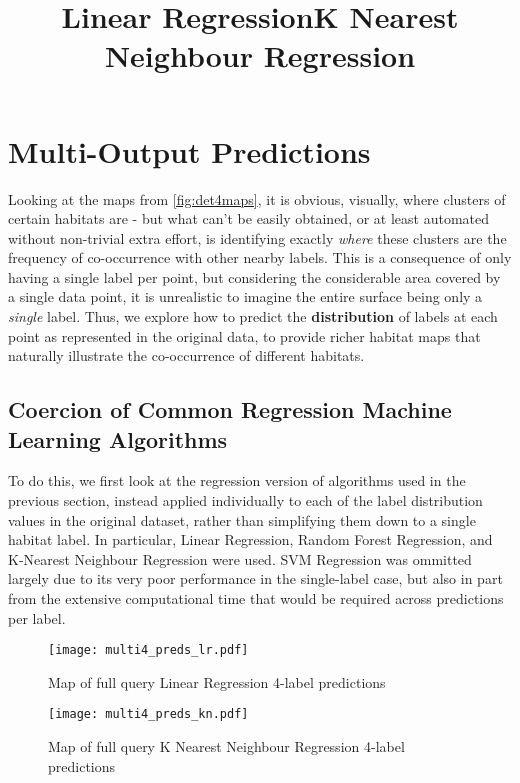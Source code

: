 

\section{Multi-Output Predictions} 
Looking at the maps from \autoref{fig:det4maps}, it is obvious, visually, where clusters of certain habitats are - but what can't be easily obtained, or at least automated without non-trivial extra effort, is identifying exactly \textit{where} these clusters are the frequency of co-occurrence with other nearby labels. This is a consequence of only having a single label per point, but considering the considerable area covered by a single data point, it is unrealistic to imagine the entire surface being only a \textit{single} label. Thus, we explore how to predict the \textbf{distribution} of labels at each point as represented in the original data, to provide richer habitat maps that naturally illustrate the co-occurrence of different habitats.

\subsection{Coercion of Common Regression Machine Learning Algorithms} \label{ss:commonMLcoercion}
To do this, we first look at the regression version of algorithms used in the previous section, instead applied individually to each of the label distribution values in the original dataset, rather than simplifying them down to a single habitat label. In particular, Linear Regression, Random Forest Regression, and K-Nearest Neighbour Regression were used. SVM Regression was ommitted largely due to its very poor performance in the single-label case, but also in part from the extensive computational time that would be required across predictions per label.

\begin{figure}[h]
    \title{\large{\textbf{Linear Regression}}}
    \centerline{\texttt{[image: multi4\_preds\_lr.pdf]}}
    \caption{Map of full query Linear Regression 4-label predictions}
    \label{fig:multi4_lr}
\end{figure}

\begin{figure}[h]
    \title{\large{\textbf{K Nearest Neighbour Regression}}}
    \centerline{\texttt{[image: multi4\_preds\_kn.pdf]}}
    \caption{Map of full query K Nearest Neighbour Regression 4-label predictions}
    \label{fig:multi4_rf}
\end{figure}

